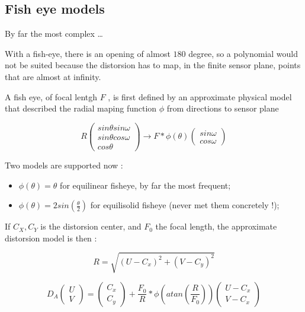 
\subsection{Fish eye models}

\label{SpGeo:FishEye}

By far the most complex \dots

With a fish-eye, there is an opening of almost $180$ degree, so a polynomial
would not be suited because the distorsion has to map, in the finite sensor plane,
points that are almost at infinity.

A fish eye, of focal lentgh $F$ , is first defined by an approximate physical model that described
the radial maping function $\phi$ from directions to sensor plane

\begin{equation}
    R  \begin{pmatrix}   sin \theta sin \omega \\  sin \theta cos \omega  \\  cos \theta  \end{pmatrix}
   \rightarrow  F * \phi(\theta) \begin{pmatrix} sin \omega \\ cos \omega  \end{pmatrix}
\end{equation}

Two models are supported now :

\begin{itemize}
   \item $\phi(\theta)=\theta$ for equilinear fisheye, by far the most frequent;
   \item $\phi(\theta)=2 sin(\frac{\theta}{2})$  for equilisolid fisheye (never met
         them concretely !);
\end{itemize}

If $C_X,C_Y$ is the distorsion center,  and $F_0$ the focal length,
the approximate distorsion model is then :

\begin{equation}
   R = \sqrt{(U-C_x)^2 + (V-C_y)^2}
\end{equation}




\begin{equation}
   D_A\begin{pmatrix}U\\V\end{pmatrix}
   = \begin{pmatrix}C_x\\C_y\end{pmatrix}
     +    \frac{F_0}{R} * \phi(atan(\frac{R}{F_0}))  \begin{pmatrix}U-C_x\\ V-C_x\end{pmatrix}
\end{equation}

